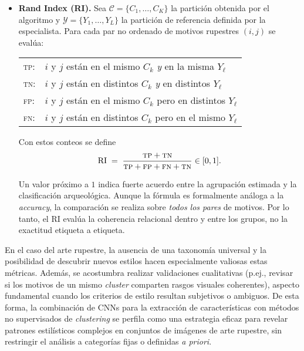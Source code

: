 \begin{itemize}
    \item \textbf{Rand Index (RI).}
    Sea \(\mathcal{C}=\{C_1,\dots,C_K\}\) la partición obtenida por el algoritmo
    y \(\mathcal{Y}=\{Y_1,\dots,Y_L\}\) la partición de referencia definida por la especialista.
    Para cada par no ordenado de motivos rupestres \((i,j)\) se evalúa:

    \begin{center}
    \begin{tabular}{@{}ll@{}}
    \textsc{tp}: & \(i\) y \(j\) están en el mismo \(C_k\) \emph{y} en la misma \(Y_\ell\) \\[2pt]
    \textsc{tn}: & \(i\) y \(j\) están en distintos \(C_k\) \emph{y} en distintos \(Y_\ell\) \\[2pt]
    \textsc{fp}: & \(i\) y \(j\) están en el mismo \(C_k\) pero en distintos \(Y_\ell\) \\[2pt]
    \textsc{fn}: & \(i\) y \(j\) están en distintos \(C_k\) pero en el mismo \(Y_\ell\)
    \end{tabular}
    \end{center}

    Con estos conteos se define
    \[
      \operatorname{RI} \;=\;
      \frac{\textsc{tp} + \textsc{tn}}
           {\textsc{tp} + \textsc{fp} + \textsc{fn} + \textsc{tn}}
      \in [0,1].
    \]

    Un valor próximo a \(1\) indica fuerte acuerdo entre la agrupación estimada y la clasificación arqueológica.
    Aunque la fórmula es formalmente análoga a la \emph{accuracy}, la comparación se realiza sobre \emph{todos los pares} de motivos.
    Por lo tanto, el RI evalúa la coherencia relacional dentro y entre los grupos, no la exactitud etiqueta a etiqueta.
\end{itemize}

En el caso del arte rupestre, la ausencia de una taxonomía universal y la posibilidad de descubrir nuevos estilos hacen especialmente valiosas estas métricas.
Además, se acostumbra realizar validaciones cualitativas (p.ej., revisar si los motivos de un mismo \textit{cluster} comparten rasgos visuales coherentes), aspecto fundamental cuando los criterios de estilo resultan subjetivos o ambiguos.
De esta forma, la combinación de CNNs para la extracción de características con métodos no supervisados de \textit{clustering} se perfila como una estrategia eficaz para revelar patrones estilísticos complejos en conjuntos de imágenes de arte rupestre, sin restringir el análisis a categorías fijas o definidas \textit{a priori}.

